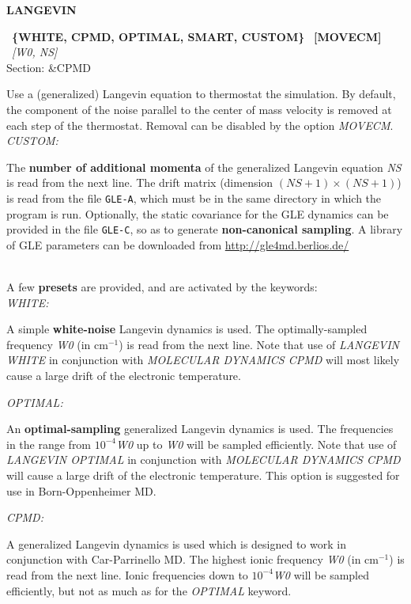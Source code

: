 \documentclass[twoside,10pt,titlepage,a4paper]{article}
\newcommand{\reflabel}[1]{\hypertarget{#1}}
\newcommand{\reflabel}[1]{\label{#1}}
\newcommand{\htref}[2]{\href{#1}{#2}}
\newcommand{\htref}[2]{\htmladdnormallink{#2}{#1}}
\newcommand{\keyword}[5]{%
\vspace{1.0cm}
\begin{minipage}{15cm}
\reflabel{#1}{\textbf{\large #1}}%
\index{#1}%
\ \textbf{#2}%
\ \textbf{#3}%
\ \textit{#4}%
     \hfill\\\smallskip
     {Section: #5}
     \hfill\\\smallskip\vskip 10pt
\end{minipage}
}%
\newcommand{\desc}[1]{%
   \hspace*{\fill} \parbox{130mm}{\sloppy
                          {#1}%
                             }
     \hfill\\\smallskip
   }%
\newcommand{\desc}[1]{#1\vspace{1ex}}
\begin{document}
\keyword{LANGEVIN}{\{WHITE, CPMD, OPTIMAL, SMART, CUSTOM\}}{[MOVECM]}{[W0, NS]}{\&CPMD}
  \desc{Use a (generalized) Langevin equation to thermostat the simulation\cite{Ceriotti10}. 
   By default, the component of the noise parallel to the center of mass velocity is 
     removed at each step of the thermostat. Removal can be disabled by the option {\sl MOVECM}.
    \\\smallskip
    {\sl CUSTOM:} \hfill\begin{minipage}[t]{10cm}
                  The {\bf number of additional momenta} of the generalized Langevin equation
                  {\sl NS} is read from the next line. The drift matrix 
                  (dimension $(NS+1)\times(NS+1)$) is read from the file \texttt{GLE-A},
                  which must be in the same directory in which the program is run. 
                  Optionally, the static covariance for the GLE dynamics can be provided
                  in the file \texttt{GLE-C}, so as to generate {\bf non-canonical sampling}. 
                  A library of GLE parameters can be downloaded from 
                  \htref{http://gle4md.berlios.de/}{http://gle4md.berlios.de/}
                      \end{minipage}
   \smallskip\\ A few {\bf presets} are provided, and are activated by the keywords:\\
    {\sl WHITE:} \hfill\begin{minipage}[t]{10cm}
                  A simple {\bf white-noise} Langevin dynamics is used. The optimally-sampled
                  frequency {\sl W0} (in cm$^{-1}$) is read from the next line. Note that use of 
                  {\sl LANGEVIN WHITE} in conjunction with {\sl MOLECULAR DYNAMICS CPMD} 
                  will most likely cause a large drift of the electronic temperature.
                      \end{minipage}
    {\sl OPTIMAL:} \hfill\begin{minipage}[t]{10cm}
                  An {\bf optimal-sampling} generalized Langevin dynamics is used. 
                  The frequencies in the range from $10^{-4}${\sl W0} up to {\sl W0}
                  will be sampled efficiently. Note that use of 
                  {\sl LANGEVIN OPTIMAL} in conjunction with {\sl MOLECULAR DYNAMICS CPMD} 
                  will cause a large drift of the electronic temperature.
                  This option is suggested for use in Born-Oppenheimer MD.
                      \end{minipage}
    {\sl CPMD:} \hfill\begin{minipage}[t]{10cm}
                  A generalized Langevin dynamics is used which is designed to 
                  work in conjunction with Car-Parrinello MD. 
                  The highest ionic frequency {\sl W0} (in cm$^{-1}$) is read from the 
                  next line. Ionic frequencies down to $10^{-4}${\sl W0} will be sampled 
                  efficiently, but not as much as for the {\sl OPTIMAL} keyword. 
                      \end{minipage}
                      
}
\end{document}
